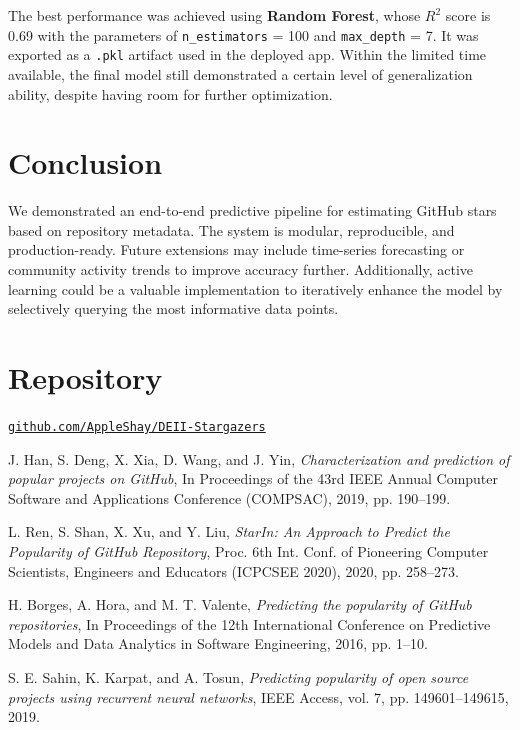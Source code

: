 \documentclass[12pt,a4paper]{article}
\begin{document}
The best performance was achieved using \textbf{Random Forest}, whose $R^2$ score is 0.69
with the parameters of \texttt{n\_estimators} = 100 and \texttt{max\_depth} = 7.
It was exported as a \texttt{.pkl} artifact used in the deployed app.
Within the limited time available, the final model still demonstrated a certain level
of generalization ability, despite having room for further optimization.


\section{Conclusion}
We demonstrated an end-to-end predictive pipeline for estimating GitHub stars based on repository metadata. The system is modular, reproducible, and production-ready. Future extensions may include time-series forecasting or community activity trends to improve accuracy further. Additionally, active learning could be a valuable implementation to iteratively enhance the model by selectively querying the most informative data points. 

\section{Repository}
\href{https://github.com/AppleShay/DEII-Stargazers/tree/main}{\texttt{github.com/AppleShay/DEII-Stargazers}}

\begin{thebibliography}{9}

J. Han, S. Deng, X. Xia, D. Wang, and J. Yin,  
\textit{Characterization and prediction of popular projects on GitHub},  
In Proceedings of the 43rd IEEE Annual Computer Software and Applications Conference (COMPSAC), 2019, pp. 190--199.


 L. Ren, S. Shan, X. Xu, and Y. Liu, \textit{StarIn: An Approach to Predict the Popularity of GitHub Repository}, Proc. 6th Int. Conf. of Pioneering Computer Scientists, Engineers and Educators (ICPCSEE 2020), 2020, pp. 258--273.

H. Borges, A. Hora, and M. T. Valente,
\textit{Predicting the popularity of GitHub repositories},
In Proceedings of the 12th International Conference on Predictive Models and Data Analytics in Software Engineering, 2016, pp. 1--10.

S. E. Sahin, K. Karpat, and A. Tosun,  
\textit{Predicting popularity of open source projects using recurrent neural networks},  
IEEE Access, vol. 7, pp. 149601--149615, 2019.

\end{thebibliography}
\end{document}
